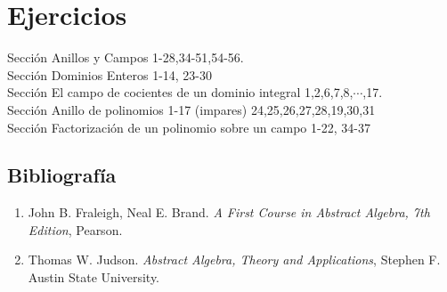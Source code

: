 
\usepackage{nopageno}  



	\section*{Ejercicios}
	\noindent
	Sección   Anillos y Campos 1-28,34-51,54-56. \\
	Sección  Dominios Enteros 1-14, 23-30 \\
	Sección   El campo de cocientes de un dominio integral 1,2,6,7,8,$\cdots$,17. \\
	Sección  Anillo de polinomios 1-17 (impares) 24,25,26,27,28,19,30,31 \\
	Sección  Factorización de un polinomio sobre un campo  1-22, 34-37 \\
	
	
	
	
	


\subsection*{Bibliografía}

\begin{enumerate}
	\item 	John B. Fraleigh, Neal E. Brand. \textit{A First Course in Abstract Algebra, 7th Edition},  Pearson.
	\item 	Thomas W. Judson. \textit{Abstract Algebra, Theory and Applications}, Stephen F. Austin State University.
\end{enumerate}


